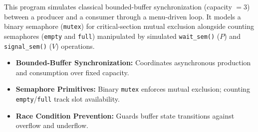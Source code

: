 \documentclass[11pt,a4paper]{article}
\begin{document}
This program simulates classical bounded-buffer synchronization (capacity $= 3$) between a producer and a consumer through a menu-driven loop. It models a binary semaphore (\texttt{mutex}) for critical-section mutual exclusion alongside counting semaphores (\texttt{empty} and \texttt{full}) manipulated by simulated \texttt{wait\_sem()} ($P$) and \texttt{signal\_sem()} ($V$) operations.

\begin{itemize}
    \item \textbf{Bounded-Buffer Synchronization:} Coordinates asynchronous production and consumption over fixed capacity.
    \item \textbf{Semaphore Primitives:} Binary \texttt{mutex} enforces mutual exclusion; counting \texttt{empty}/\texttt{full} track slot availability.
    \item \textbf{Race Condition Prevention:} Guards buffer state transitions against overflow and underflow.
\end{itemize}
\end{document}
